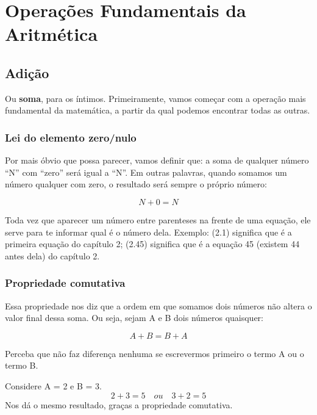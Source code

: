\chapter{Operações Fundamentais da Aritmética}

\newpage
\section{Adição}

Ou \textbf{soma}, para os íntimos. Primeiramente, vamos começar com a operação mais fundamental da matemática, a partir da qual podemos encontrar todas as outras. 

\subsection{Lei do elemento zero/nulo}

Por mais óbvio que possa parecer, vamos definir que: a soma de qualquer número “N” com “zero” será igual a “N”. Em outras palavras, quando somamos um número qualquer com zero, o resultado será sempre o próprio número:

\begin{equation}
    N + 0 = N
\end{equation}

\begin{tcolorbox}[title=IMPORTANTE]
    Toda vez que aparecer um número entre parenteses na frente de uma equação, ele serve para te informar qual é o número dela. Exemplo: (2.1) significa que é a primeira equação do capítulo 2; (2.45) significa que é a equação 45 (existem 44 antes dela) do capítulo 2.
\end{tcolorbox}


\subsection{Propriedade comutativa}

Essa propriedade nos diz que a ordem em que somamos dois números não altera o valor final dessa soma. Ou seja, sejam A e B dois números quaisquer:

\begin{equation}
    A+B=B+A
\end{equation}

Perceba que não faz diferença nenhuma se escrevermos primeiro o termo A ou o termo B.\\
\begin{exemplo}
Considere A = 2 e B = 3.
    \begin{equation}
        2+3=5 \quad ou \quad 3+2=5
    \end{equation}
Nos dá o mesmo resultado, graças a propriedade comutativa.
\end{exemplo}

